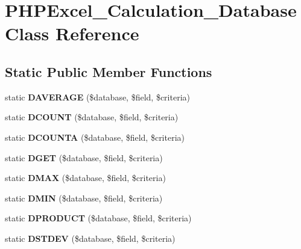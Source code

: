 \section{P\+H\+P\+Excel\+\_\+\+Calculation\+\_\+\+Database Class Reference}
\label{class_p_h_p_excel___calculation___database}
\subsection*{Static Public Member Functions}
\begin{DoxyCompactItemize}
\item 
static {\bfseries D\+A\+V\+E\+R\+A\+G\+E} (\$database, \$field, \$criteria)\label{class_p_h_p_excel___calculation___database_ae6b7487cfdef582b5fb63b6c6c680f03}

\item 
static {\bfseries D\+C\+O\+U\+N\+T} (\$database, \$field, \$criteria)\label{class_p_h_p_excel___calculation___database_aa379b585e6a4dd6664e3f083295f0fb4}

\item 
static {\bfseries D\+C\+O\+U\+N\+T\+A} (\$database, \$field, \$criteria)\label{class_p_h_p_excel___calculation___database_a544028c507c6407dcc6f6e397557a58a}

\item 
static {\bfseries D\+G\+E\+T} (\$database, \$field, \$criteria)\label{class_p_h_p_excel___calculation___database_a608738f7a5a0883683a0e88fdb20341f}

\item 
static {\bfseries D\+M\+A\+X} (\$database, \$field, \$criteria)\label{class_p_h_p_excel___calculation___database_aff52b24c57b4f33b0626b3fd1f84398d}

\item 
static {\bfseries D\+M\+I\+N} (\$database, \$field, \$criteria)\label{class_p_h_p_excel___calculation___database_ae058b7ab1941225c5d45dea3be006b8a}

\item 
static {\bfseries D\+P\+R\+O\+D\+U\+C\+T} (\$database, \$field, \$criteria)\label{class_p_h_p_excel___calculation___database_acb0a089548fcf8cd5faa510562909256}

\item 
static {\bfseries D\+S\+T\+D\+E\+V} (\$database, \$field, \$criteria)\label{class_p_h_p_excel___calculation___database_a6bf57c72f66f55fc879e2116cc037143}


\end{DoxyCompactItemize}

